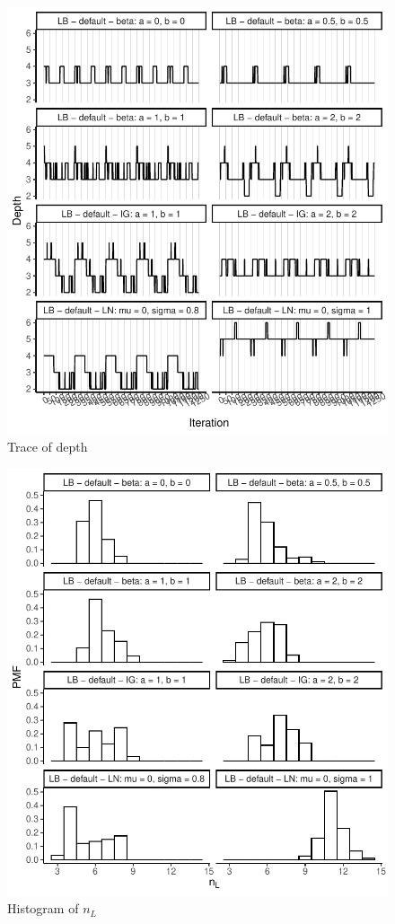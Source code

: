 \documentclass{amsart}
\begin{document}
\begin{figure}[ht]
	\centering
	\includegraphics[width=0.95\linewidth]{trace_depth_1.pdf}
	\caption{Trace of depth}
	\label{fig:trace:depth:1}
\end{figure}

\begin{figure}[ht]
	\centering
	\includegraphics[width=0.95\linewidth]{hist_nl_1.pdf}
	\caption{Histogram of $n_L$}
	\label{fig:hist:nl:1}
\end{figure}
\end{document}

